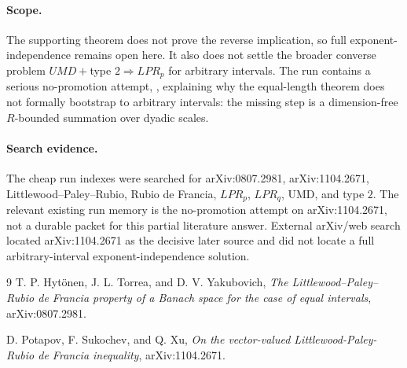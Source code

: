 \documentclass[11pt]{article}
\begin{document}
\paragraph{Scope.}
The supporting theorem does not prove the reverse implication, so full
exponent-independence remains open here.  It also does not settle the broader
converse problem \(UMD+\)type \(2\Rightarrow LPR_p\) for arbitrary intervals.
The run contains a serious no-promotion attempt,
, explaining
why the equal-length theorem does not formally bootstrap to arbitrary
intervals: the missing step is a dimension-free \(R\)-bounded summation over
dyadic scales.

\paragraph{Search evidence.}
The cheap run indexes were searched for arXiv:0807.2981, arXiv:1104.2671,
Littlewood--Paley--Rubio, Rubio de Francia, \(LPR_p\), \(LPR_q\), UMD, and
type \(2\).  The relevant existing run memory is the no-promotion attempt on
arXiv:1104.2671, not a durable packet for this partial literature answer.
External arXiv/web search located arXiv:1104.2671 as the decisive later
source and did not locate a full arbitrary-interval exponent-independence
solution.

\begin{thebibliography}{9}
T. P. Hytönen, J. L. Torrea, and D. V. Yakubovich,
\emph{The Littlewood--Paley--Rubio de Francia property of a Banach space for
the case of equal intervals},
arXiv:0807.2981.

D. Potapov, F. Sukochev, and Q. Xu,
\emph{On the vector-valued Littlewood-Paley-Rubio de Francia inequality},
arXiv:1104.2671.
\end{thebibliography}
\end{document}
